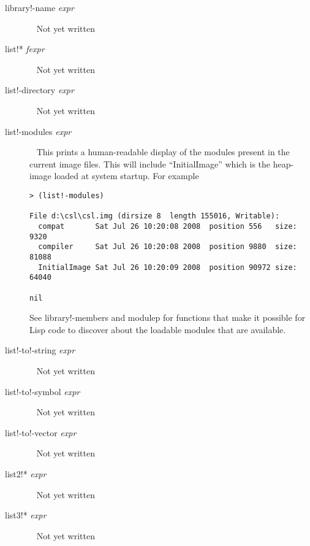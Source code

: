 \documentclass[a4paper,11pt]{article}
\begin{document}
\begin{description}
\item [{\ttfamily library!-name} {\itshape  expr}] ~\newline
Not yet written

\item [{\ttfamily list!*} {\itshape  fexpr}] ~\newline
Not yet written

\item [{\ttfamily list!-directory} {\itshape  expr}] ~\newline
Not yet written
  

\item [{\ttfamily list!-modules} {\itshape  expr}] ~\newline
This prints a human-readable display of the modules present in the current
image files. This will include ``InitialImage'' which is the heap-image
loaded at system startup. For example
\begin{verbatim}
> (list!-modules)
  
File d:\csl\csl.img (dirsize 8  length 155016, Writable):
  compat       Sat Jul 26 10:20:08 2008  position 556   size: 9320
  compiler     Sat Jul 26 10:20:08 2008  position 9880  size: 81088
  InitialImage Sat Jul 26 10:20:09 2008  position 90972 size: 64040
  
nil
\end{verbatim}
  
See {\ttfamily library!-members} and {\ttfamily modulep} for functions that
make it possible for Lisp code to discover about the loadable modules that are
available.

\item [{\ttfamily list!-to!-string} {\itshape  expr}] ~\newline
Not yet written

\item [{\ttfamily list!-to!-symbol} {\itshape  expr}] ~\newline
Not yet written

\item [{\ttfamily list!-to!-vector} {\itshape  expr}] ~\newline
Not yet written

\item [{\ttfamily list2!*} {\itshape  expr}] ~\newline
Not yet written

\item [{\ttfamily list3!*} {\itshape  expr}] ~\newline
Not yet written


\end{description}
\end{document}
